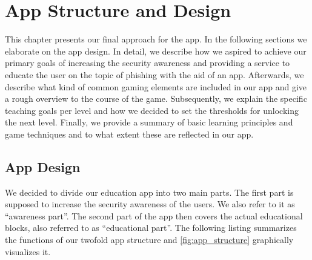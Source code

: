 
\section{App Structure and Design}
\label{s:approach}
This chapter presents our final approach for the app.
 In the following sections we elaborate on the app design.
In detail, we describe how we aspired to achieve our primary goals of increasing the security awareness and providing a service to educate the user on the topic of phishing with the aid of an app.
Afterwards, we describe what kind of common gaming elements are included in our app and give a rough overview to the course of the game.
Subsequently, we explain the specific teaching goals per level and how we decided to set the thresholds for unlocking the next level.
Finally, we provide a summary of basic learning principles and game techniques and to what extent these are reflected in our app.
\subsection{App Design}
\label{s:app_design}
We decided to divide our education app into two main parts.
 The first part is supposed to increase the security awareness of the users.
We also refer to it as ``awareness part''.
 The second part of the app then covers the actual educational blocks, also referred to as ``educational part''.
 The following listing summarizes the functions of our twofold app structure and \autoref{fig:app_structure} graphically visualizes it.

